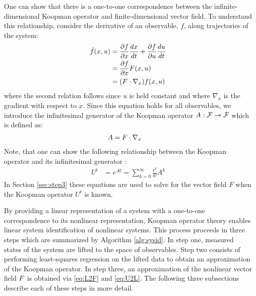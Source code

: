 One can show that there is a one-to-one correspondence between the infinite-dimensional Koopman operator and finite-dimensional vector field.
To understand this relationship, consider the derivative of an observable, $\dot{f}$, along trajectories of the system:
\begin{align}
\dot{f}(x,u) &= \frac{\partial f}{\partial x} \frac{dx}{dt} + \frac{\partial f}{\partial u}\frac{du}{dt} \\
           &= \frac{\partial f}{\partial x} F(x,u) \\
           &= ( F \cdot \nabla_{x} ) f(x,u)
\end{align}
where the second relation follows since $u$ is held constant and where $\nabla_x$ is the gradient with respect to $x$.
Since this equation holds for all observables, we introduce the infinitesimal generator of the Koopman operator ${A:\mathcal{F} \to \mathcal{F}}$ \cite{} which is defined as:
\begin{align}
    A &= F \cdot \nabla_{x}
    \label{eq:L2F}
\end{align}
Note, that one can show the following relationship between the Koopman operator and its infinitesimal generator \cite[Section 7.6]{lasota2013chaos}:
\begin{align}
    U^t &= e^{A t} = \sum_{k=0}^\infty \frac{t^k}{k!} A^k
    \label{eq:U2L}
\end{align}
In Section \ref{sec:step3} these equations are used to solve for the vector field $F$ when the Koopman operator $U^t$ is known.

By providing a linear representation of a system with a one-to-one correspondence to its nonlinear representation, Koopman operator theory enables linear system identification of nonlinear systems. 
This process proceeds in three steps which are summarized by Algorithm \ref{alg:sysid}.
In step one, measured states of the system are lifted to the space of observables.
Step two consists of performing least-squares regression on the lifted data to obtain an approximation of the Koopman operator.
In step three, an approximation of the nonlinear vector field $F$ is obtained via \eqref{eq:L2F} and \eqref{eq:U2L}.
The following three subsections describe each of these steps in more detail.



